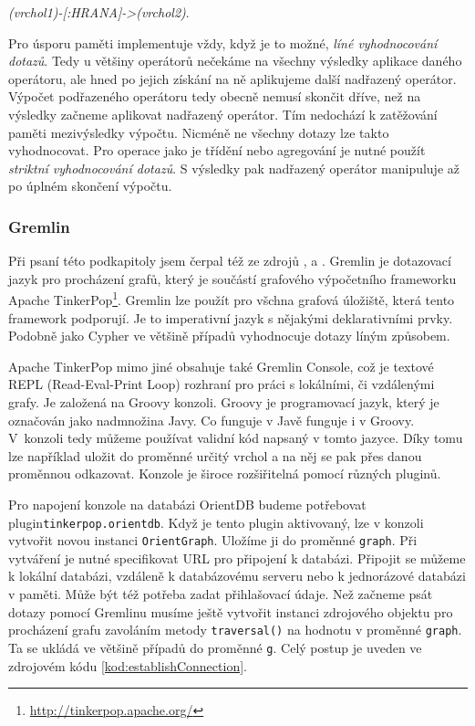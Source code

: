 \documentclass[
  program=infoi,
  biblatex=true,
  figures=true,
  glossaries=false,
  index,
  sourcecodes=true
]{kidiplom}
\begin{document}
\begin{center}
\textit{(vrchol1)-[:HRANA]->(vrchol2)}.
\end{center}

Pro úsporu paměti implementuje vždy, když je to možné, \textit{líné vyhodnocování dotazů}. Tedy u většiny operátorů nečekáme na všechny výsledky aplikace daného operátoru, ale hned po jejich získání na ně aplikujeme další nadřazený operátor. Výpočet podřazeného operátoru tedy obecně nemusí skončit dříve, než na výsledky začneme aplikovat nadřazený operátor. Tím nedochází k zatěžování paměti mezivýsledky výpočtu. Nicméně ne všechny dotazy lze takto vyhodnocovat. Pro operace jako je třídění nebo agregování je nutné použít \textit{striktní vyhodnocování dotazů}. S výsledky pak nadřazený operátor manipuluje až po úplném skončení výpočtu.

\subsubsection{Gremlin}
Při psaní této podkapitoly jsem čerpal též ze zdrojů \cite{practicalGremlin}, \cite{tinkerPopDoc} a \cite{orientDBDoc}. Gremlin je dotazovací jazyk pro procházení grafů, který je součástí grafového výpočetního frameworku Apache TinkerPop\footnote{\url{http://tinkerpop.apache.org/}}. Gremlin lze použít pro všchna grafová úložiště, která tento framework podporují. Je to imperativní jazyk s nějakými deklarativními prvky. Podobně jako Cypher ve většině případů vyhodnocuje dotazy líným způsobem.

Apache TinkerPop mimo jiné obsahuje také Gremlin Console, což je textové REPL (Read-Eval-Print Loop) rozhraní pro práci s lokálními, či vzdálenými grafy. Je založená na Groovy konzoli. Groovy je programovací jazyk, který je označován jako nadmnožina Javy. Co funguje v Javě funguje i v Groovy. V~konzoli tedy můžeme používat validní kód napsaný v tomto jazyce. Díky tomu lze například uložit do proměnné určitý vrchol a na něj se pak přes danou proměnnou odkazovat. Konzole je široce rozšiřitelná pomocí různých pluginů.

Pro napojení konzole na databázi OrientDB budeme potřebovat plugin\linebreak \texttt{tinkerpop.orientdb}. Když je tento plugin aktivovaný, lze v konzoli vytvořit novou instanci \texttt{OrientGraph}. Uložíme ji do proměnné \texttt{graph}. Při vytváření je nutné specifikovat URL pro připojení k databázi. Připojit se můžeme k lokální databázi, vzdáleně k databázovému serveru nebo k jednorázové databázi v paměti. Může být též potřeba zadat přihlašovací údaje. Než začneme psát dotazy pomocí Gremlinu musíme ještě vytvořit instanci zdrojového objektu pro procházení grafu zavoláním metody \texttt{traversal()} na hodnotu v proměnné \texttt{graph}. Ta se ukládá ve většině případů do proměnné \texttt{g}. Celý postup je uveden ve zdrojovém kódu \ref{kod:establishConnection}.
\end{document}
